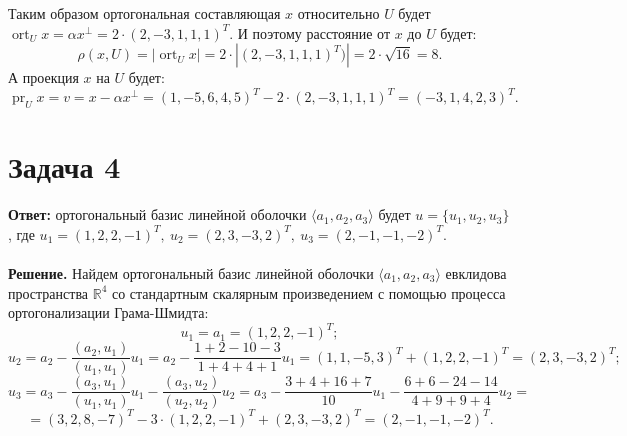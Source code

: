 \documentclass{article}
\DeclareMathOperator{\pr}{pr}
\DeclareMathOperator{\ort}{ort}
\begin{document}
Таким образом ортогональная составляющая $x$ относительно $U$ будет $\ort_U x = \alpha x^{\bot} = 2\cdot(2,-3,1,1,1)^T$. И поэтому расстояние от $x$ до $U$ будет: 
$$\rho(x, U) =|\ort_U x|=2\cdot|(2,-3,1,1,1)^T)|=2\cdot\sqrt{16}=8 .$$ 
А проекция $x$ на $U$ будет: 
$$\pr_U x=v=x-\alpha x^{\bot}=(1,-5,6,4,5)^T-2\cdot(2,-3,1,1,1)^T=(-3,1,4,2,3)^T.$$

\section*{Задача 4}
{\bf Ответ:} ортогональный базис линейной оболочки $\langle a_1, a_2, a_3 \rangle$ будет $u=\{u_1,u_2,u_3\}$, где $u_1=(1,2,2,-1)^T,\ u_2=(2,3,-3,2)^T,\ u_3=(2,-1,-1,-2)^T$.
\\
\\
{\bf Решение.} Найдем ортогональный базис линейной оболочки $\langle a_1, a_2, a_3 \rangle$ евклидова пространства $\mathbb{R}^4$ со стандартным скалярным произведением с помощью процесса ортогонализации Грама-Шмидта:
$$u_1=a_1=(1,2,2,-1)^T;$$
$$u_2=a_2-\frac{(a_2,u_1)}{(u_1,u_1)}u_1=a_2-\frac{1+2-10-3}{1+4+4+1}u_1=(1,1,-5,3)^T+(1,2,2,-1)^T=(2,3,-3,2)^T;$$
$$u_3=a_3-\frac{(a_3,u_1)}{(u_1,u_1)}u_1-\frac{(a_3,u_2)}{(u_2,u_2)}u_2=a_3-\frac{3+4+16+7}{10}u_1-\frac{6+6-24-14}{4+9+9+4}u_2=$$
$$=(3,2,8,-7)^T-3\cdot(1,2,2,-1)^T+(2,3,-3,2)^T=(2,-1,-1,-2)^T.$$
\end{document}
